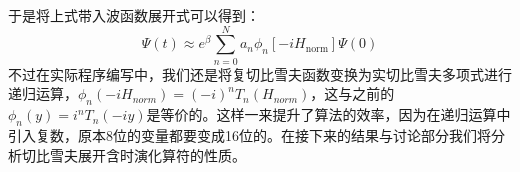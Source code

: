 于是将上式带入波函数展开式可以得到：
\begin{equation}
  \Psi(t) \approx e^{\beta} \sum_{n=0}^{N} a_n \phi_n[-i H_{\text{norm}}] \Psi(0)
\end{equation}
不过在实际程序编写中，我们还是将复切比雪夫函数变换为实切比雪夫多项式进行递归运算，$\phi_n(-iH_{norm}) = {(-i)}^{n}T_n(H_{norm})$，这与之前的$\phi_n(y) = i^n T_n(-iy)$是等价的。这样一来提升了算法的效率，因为在递归运算中引入复数，原本8位的变量都要变成16位的。在接下来的结果与讨论部分我们将分析切比雪夫展开含时演化算符的性质。

                  